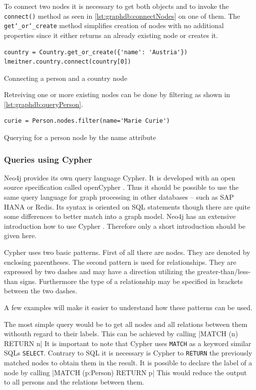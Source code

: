 To connect two nodes it is necessary to get both objects and to invoke the \texttt{connect()} method as seen in \autoref{lst:graphdb:connectNodes} on one of them.
The \texttt{get\char`_or\char`_create} method simplifies creation of nodes with no additional properties since it either returns an already existing node or creates it.
\begin{listing}[H]
\begin{verbatim}
country = Country.get_or_create({'name': 'Austria'})
lmeitner.country.connect(country[0])
\end{verbatim}
\caption{Connecting a person and a country node}
\label{lst:graphdb:connectNodes}
\end{listing}

Retreiving one or more existing nodes can be done by filtering as shown in \autoref{lst:graphdb:queryPerson}.
\begin{listing}[H]
\begin{verbatim}
curie = Person.nodes.filter(name='Marie Curie')
\end{verbatim}
\caption{Querying for a person node by the name attribute}
\label{lst:graphdb:queryPerson}
\end{listing}

\subsubsection{Queries using Cypher}
\label{sec:graphdb:cypher}
Neo4j provides its own query language Cypher. It is developed with an open source specification called openCypher \autocite{openCypher}.
Thus it should be possible to use the same query language for graph processing in other databases -- such as SAP HANA or Redis.
Its syntax is oriented on SQL statements though there are quite some differences to better match into a graph model.
Neo4j has an extensive introduction how to use Cypher \autocite{neo4j:cypher_introduction}.
Therefore only a short introduction should be given here.

Cypher uses two basic patterns.
First of all there are nodes.
They are denoted by enclosing parentheses.
The second pattern is used for relationships.
They are expressed by two dashes and may have a direction utilizing the greater-than/less-than signs.
Furthermore the type of a relationship may be specified in brackets between the two dashes.

A few examples will make it easier to understand how these patterns can be used.

The most simple query would be to get all nodes and all relations between them withouth regard to their labels.
This can be achieved by calling |MATCH (n) RETURN n|
It is important to note that Cypher uses \texttt{MATCH} as a keyword similar SQLs \texttt{SELECT}.
Contrary to SQL it is necessary is Cypher to \texttt{RETURN} the previously matched nodes to obtain them in the result.
It is possible to declare the label of a node by calling |MATCH (p:Person) RETURN p|
This would reduce the output to all persons and the relations between them.

